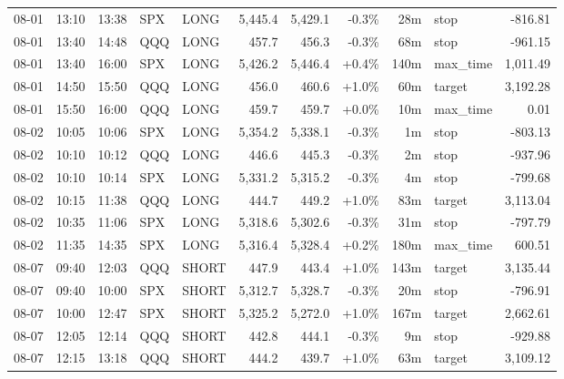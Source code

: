 \documentclass[11pt,a4paper,twoside]{article}
\begin{document}
\begin{center}
\begin{longtable}{>{\color{txtmain}}l l l l l r r r r >{\color{txtmain}}l r}
08-01 & 13:10 & 13:38 & SPX & LONG & 5,445.4 & 5,429.1 & \textcolor{lossred}{-0.3\%} & 28m & stop & \textcolor{lossred}{-816.81} \\
08-01 & 13:40 & 14:48 & QQQ & LONG & 457.7 & 456.3 & \textcolor{lossred}{-0.3\%} & 68m & stop & \textcolor{lossred}{-961.15} \\
08-01 & 13:40 & 16:00 & SPX & LONG & 5,426.2 & 5,446.4 & \textcolor{wingreen}{+0.4\%} & 140m & max\_time & \textcolor{wingreen}{1,011.49} \\
08-01 & 14:50 & 15:50 & QQQ & LONG & 456.0 & 460.6 & \textcolor{wingreen}{+1.0\%} & 60m & target & \textcolor{wingreen}{3,192.28} \\
08-01 & 15:50 & 16:00 & QQQ & LONG & 459.7 & 459.7 & \textcolor{wingreen}{+0.0\%} & 10m & max\_time & \textcolor{wingreen}{0.01} \\
08-02 & 10:05 & 10:06 & SPX & LONG & 5,354.2 & 5,338.1 & \textcolor{lossred}{-0.3\%} & 1m & stop & \textcolor{lossred}{-803.13} \\
08-02 & 10:10 & 10:12 & QQQ & LONG & 446.6 & 445.3 & \textcolor{lossred}{-0.3\%} & 2m & stop & \textcolor{lossred}{-937.96} \\
08-02 & 10:10 & 10:14 & SPX & LONG & 5,331.2 & 5,315.2 & \textcolor{lossred}{-0.3\%} & 4m & stop & \textcolor{lossred}{-799.68} \\
08-02 & 10:15 & 11:38 & QQQ & LONG & 444.7 & 449.2 & \textcolor{wingreen}{+1.0\%} & 83m & target & \textcolor{wingreen}{3,113.04} \\
08-02 & 10:35 & 11:06 & SPX & LONG & 5,318.6 & 5,302.6 & \textcolor{lossred}{-0.3\%} & 31m & stop & \textcolor{lossred}{-797.79} \\
08-02 & 11:35 & 14:35 & SPX & LONG & 5,316.4 & 5,328.4 & \textcolor{wingreen}{+0.2\%} & 180m & max\_time & \textcolor{wingreen}{600.51} \\
08-07 & 09:40 & 12:03 & QQQ & SHORT & 447.9 & 443.4 & \textcolor{wingreen}{+1.0\%} & 143m & target & \textcolor{wingreen}{3,135.44} \\
08-07 & 09:40 & 10:00 & SPX & SHORT & 5,312.7 & 5,328.7 & \textcolor{lossred}{-0.3\%} & 20m & stop & \textcolor{lossred}{-796.91} \\
08-07 & 10:00 & 12:47 & SPX & SHORT & 5,325.2 & 5,272.0 & \textcolor{wingreen}{+1.0\%} & 167m & target & \textcolor{wingreen}{2,662.61} \\
08-07 & 12:05 & 12:14 & QQQ & SHORT & 442.8 & 444.1 & \textcolor{lossred}{-0.3\%} & 9m & stop & \textcolor{lossred}{-929.88} \\
08-07 & 12:15 & 13:18 & QQQ & SHORT & 444.2 & 439.7 & \textcolor{wingreen}{+1.0\%} & 63m & target & \textcolor{wingreen}{3,109.12} \\

\end{longtable}
\end{center}
\end{document}

